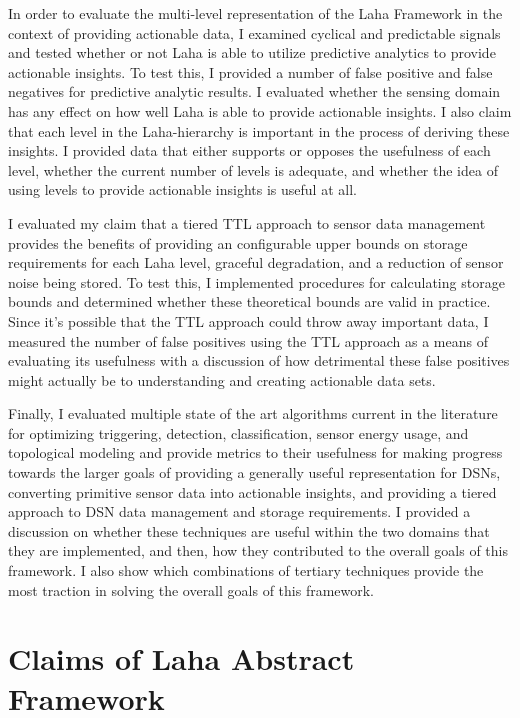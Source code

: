 In order to evaluate the multi-level representation of the Laha Framework in the context of providing actionable data, I examined cyclical and predictable signals and tested whether or not Laha is able to utilize predictive analytics to provide actionable insights. To test this, I provided a number of false positive and false negatives for predictive analytic results. I evaluated whether the sensing domain has any effect on how well Laha is able to provide actionable insights. I also claim that each level in the Laha-hierarchy is important in the process of deriving these insights. I provided data that either supports or opposes the usefulness of each level, whether the current number of levels is adequate, and whether the idea of using levels to provide actionable insights is useful at all.

I evaluated my claim that a tiered TTL approach to sensor data management provides the benefits of providing an configurable upper bounds on storage requirements for each Laha level, graceful degradation, and a reduction of sensor noise being stored. To test this, I implemented procedures for calculating storage bounds and determined whether these theoretical bounds are valid in practice. Since it's possible that the TTL approach could throw away important data, I measured the number of false positives using the TTL approach as a means of evaluating its usefulness with a discussion of how detrimental these false positives might actually be to understanding and creating actionable data sets.

Finally, I evaluated multiple state of the art algorithms current in the literature for optimizing triggering, detection, classification, sensor energy usage, and topological modeling and provide metrics to their usefulness for making progress towards the larger goals of providing a generally useful representation for DSNs, converting primitive sensor data into actionable insights, and providing a tiered approach to DSN data management and storage requirements. I provided a discussion on whether these techniques are useful within the two domains that they are implemented, and then, how they contributed to the overall goals of this framework. I also show which combinations of tertiary techniques provide the most traction in solving the overall goals of this framework.

\section{Claims of Laha Abstract Framework}\label{sec:anticipated-contributions-of-laha}

